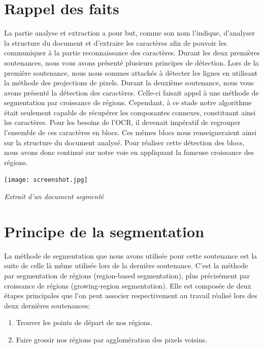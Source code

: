 \documentclass[a4paper,12pt]{report}
\begin{document}
\section{Rappel des faits}

La partie analyse et extraction a pour but, comme son nom l'indique, d'analyser la
structure du document et d'extraire les caractères afin de pouvoir les communiquer à la
partie reconnaissance des caractères. Durant les deux premières soutenances, nous vous
avons présenté plusieurs principes de détection. Lors de la première soutenance, nous nous
sommes attachés à détecter les lignes en utilisant la méthode des projections de pixels.
Durant la deuxième soutenance, nous vous avons présenté la détection des
caractères. Celle-ci faisait appel à une méthode de segmentation par croissance de régions.
Cependant, à ce stade notre algorithme était seulement capable de récupérer les
composantes connexes, constituant ainsi les caractères. Pour les besoins de l'OCR, il
devenait impératif de regrouper l'ensemble de ces caractères en blocs. Ces mêmes blocs
nous renseigneraient ainsi sur la structure du document analysé. Pour réaliser cette
détection des blocs, nous avons donc continué sur notre voie en appliquant la fameuse
croissance des régions.

\begin{center}
  \texttt{[image: screenshot.jpg]}
  \caption{\emph{Extrait d'un document segment\'e}}
\end{center}



\section{Principe de la segmentation}

La méthode de segmentation que nous avons utilisée pour cette soutenance est la suite
de celle là même utilisée lors de la dernière soutenance. C'est la méthode par segmentation
de régions (region-based segmentation), plus précis\'ement par croissance de régions
(growing-region segmentation). Elle est composée de deux étapes principales que l'on peut
associer respectivement au travail réalisé lors des deux dernières soutenances:

\begin{enumerate}
\item Trouver les points de départ de nos régions.
\item Faire grossir nos régions par agglomération des pixels voisins.
\end{enumerate}
\end{document}
